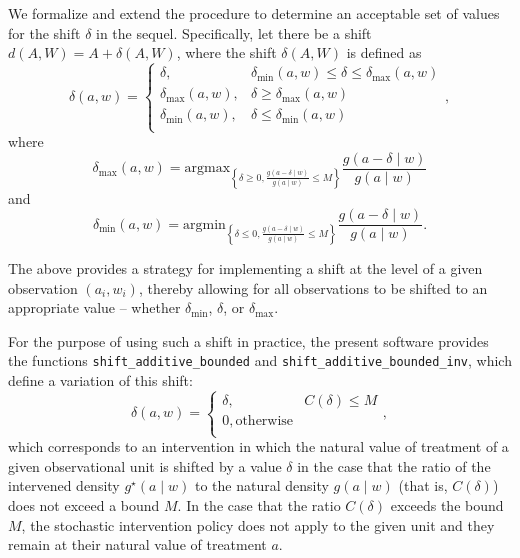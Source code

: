 \documentclass[12pt, krantz2,]{krantz}
\theoremstyle{definition}
\theoremstyle{definition}
\theoremstyle{definition}
\newcommand{\1}{\mathbbm{1}}
\begin{document}
We formalize and extend the procedure to determine an acceptable set of values
for the shift \(\delta\) in the sequel. Specifically, let there be a shift \(d(A, W) = A + \delta(A, W)\), where the shift \(\delta(A, W)\) is defined as
\begin{equation}
  \delta(a, w) =
    \begin{cases}
      \delta, & \delta_{\text{min}}(a,w) \leq \delta \leq
        \delta_{\text{max}}(a,w) \\
      \delta_{\text{max}}(a,w), & \delta \geq \delta_{\text{max}}(a,w) \\
      \delta_{\text{min}}(a,w), & \delta \leq \delta_{\text{min}}(a,w) \\
    \end{cases},
\end{equation}
where \[\delta_{\text{max}}(a, w) = \text{argmax}_{\left\{\delta \geq 0,
\frac{g(a - \delta \mid w)}{g(a \mid w)} \leq M \right\}} \frac{g(a - \delta
\mid w)}{g(a \mid w)}\] and
\[\delta_{\text{min}}(a, w) = \text{argmin}_{\left\{\delta \leq 0,
\frac{g(a - \delta \mid w)}{g(a \mid w)} \leq M \right\}} \frac{g(a - \delta
\mid w)}{g(a \mid w)}.\]

The above provides a strategy for implementing a shift at the level of a given
observation \((a_i, w_i)\), thereby allowing for all observations to be shifted
to an appropriate value -- whether \(\delta_{\text{min}}\), \(\delta\), or
\(\delta_{\text{max}}\).

For the purpose of using such a shift in practice, the present software
provides the functions \texttt{shift\_additive\_bounded} and
\texttt{shift\_additive\_bounded\_inv}, which define a variation of this shift:
\begin{equation}
  \delta(a, w) =
    \begin{cases}
      \delta, & C(\delta) \leq M \\
      0, \text{otherwise} \\
    \end{cases},
  \label{eq:shift-simple}
\end{equation}
which corresponds to an intervention in which the natural value of treatment
of a given observational unit is shifted by a value \(\delta\) in the case that
the ratio of the intervened density \(g^{\star}(a \mid w)\) to the natural
density \(g(a \mid w)\) (that is, \(C(\delta)\)) does not exceed a bound \(M\). In
the case that the ratio \(C(\delta)\) exceeds the bound \(M\), the stochastic
intervention policy does not apply to the given unit and they remain at their
natural value of treatment \(a\).
\end{document}
